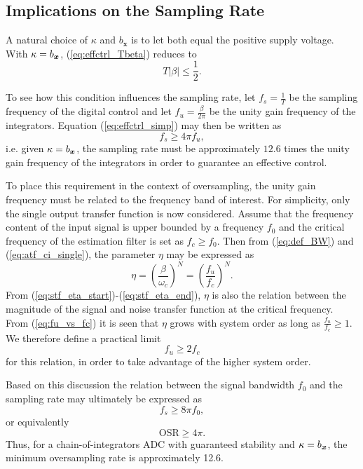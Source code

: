 \subsection{Implications on the Sampling Rate}
A natural choice of $\kappa$ and $b_{\bm{x}}$ is to let both equal the positive supply voltage. With $\kappa = b_{\bm{x}}$, (\ref{eq:effctrl_Tbeta}) reduces to
\begin{equation}
    \label{eq:effctrl_simp}
    T|\beta| \leq \frac{1}{2}.
\end{equation}

To see how this condition influences the sampling rate, let $f_s = \frac{1}{T}$ be the sampling frequency of the digital control and let $f_u = \frac{\beta}{2 \pi}$ be the unity gain frequency of the integrators. Equation (\ref{eq:effctrl_simp}) may then be written as
\begin{equation}
    \label{eq:fs4fu}
    f_s \geq 4 \pi f_u,
\end{equation}
i.e. given $\kappa = b_{\bm{x}}$, the sampling rate must be approximately $12.6$ times the unity gain frequency of the integrators in order to guarantee an effective control.

To place this requirement in the context of oversampling, the unity gain frequency must be related to the frequency band of interest. For simplicity, only the single output transfer function is now considered. Assume that the frequency content of the input signal is upper bounded by a frequency $f_0$ and the critical frequency of the estimation filter is set as $f_c \geq f_0$. Then from (\ref{eq:def_BW}) and (\ref{eq:atf_ci_single}), the parameter $\eta$ may be expressed as
\begin{equation}
    \label{eq:fu_vs_fc}
    \eta = \left(\frac{\beta}{\omega_c}\right)^{N} = \left( \frac{f_u}{f_c} \right)^N.
\end{equation}
From (\ref{eq:stf_eta_start})-(\ref{eq:stf_eta_end}), $\eta$ is also the relation between the magnitude of the signal and noise transfer function at the critical frequency. From (\ref{eq:fu_vs_fc}) it is seen that $\eta$ grows with system order as long as $\frac{f_u}{f_c} \geq 1$. We therefore define a practical limit
\begin{equation}
    f_u \geq 2f_c
\end{equation}
for this relation, in order to take advantage of the higher system order.

Based on this discussion the relation between the signal bandwidth $f_0$ and the sampling rate may ultimately be expressed as
\begin{equation}
    f_s \geq 8 \pi f_0,
\end{equation}
or equivalently
\begin{equation}
    \text{OSR} \geq 4\pi.
\end{equation}
Thus, for a chain-of-integrators ADC with guaranteed stability and $\kappa=b_{\bm{x}}$, the minimum oversampling rate is approximately 12.6.

